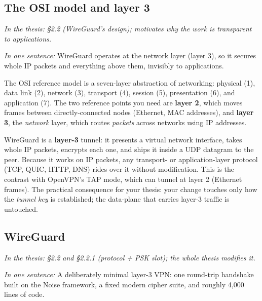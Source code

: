 \documentclass[11pt]{article}
\newcommand{\seethesis}[1]{%
  {\small\color{softgray}\textit{In the thesis: #1}}\par\vspace{3pt}}
\newcommand{\nutshell}[1]{\noindent\textit{In one sentence:} #1\par\vspace{4pt}}
\begin{document}
\subsection{The OSI model and layer 3}
\seethesis{\S2.2 (WireGuard's design); motivates why the work is transparent to applications.}
\nutshell{WireGuard operates at the network layer (layer 3), so it secures whole
IP packets and everything above them, invisibly to applications.}

The OSI reference model is a seven-layer abstraction of networking: physical (1),
data link (2), network (3), transport (4), session (5), presentation (6), and
application (7). The two reference points you need are \textbf{layer 2}, which
moves frames between directly-connected nodes (Ethernet, MAC addresses), and
\textbf{layer 3}, the \emph{network} layer, which routes \emph{packets} across
networks using IP addresses.

WireGuard is a \textbf{layer-3} tunnel: it presents a virtual network interface,
takes whole IP packets, encrypts each one, and ships it inside a UDP datagram to
the peer. Because it works on IP packets, any transport- or application-layer
protocol (TCP, QUIC, HTTP, DNS) rides over it without modification. This is the
contrast with OpenVPN's TAP mode, which can tunnel at layer 2 (Ethernet frames).
The practical consequence for your thesis: your change touches only how the
\emph{tunnel key} is established; the data-plane that carries layer-3 traffic is
untouched.

\subsection{WireGuard}
\seethesis{\S2.2 and \S2.2.1 (protocol + PSK slot); the whole thesis modifies it.}
\nutshell{A deliberately minimal layer-3 VPN: one round-trip handshake built on
the Noise framework, a fixed modern cipher suite, and roughly 4{,}000 lines of
code.}
\end{document}
